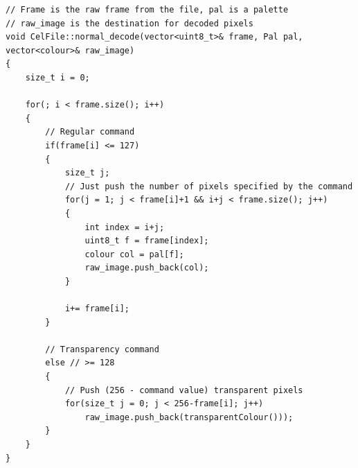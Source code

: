 \documentclass[a4paper]{article}
\begin{document}
	\begin{lstlisting}
// Frame is the raw frame from the file, pal is a palette
// raw_image is the destination for decoded pixels
void CelFile::normal_decode(vector<uint8_t>& frame, Pal pal, vector<colour>& raw_image)
{
    size_t i = 0;
    
    for(; i < frame.size(); i++)
    {   
        // Regular command
        if(frame[i] <= 127)
        {    
            size_t j;
            // Just push the number of pixels specified by the command
            for(j = 1; j < frame[i]+1 && i+j < frame.size(); j++)
            {
                int index = i+j;
                uint8_t f = frame[index];
                colour col = pal[f];
                raw_image.push_back(col);
            }
    
            i+= frame[i];
        }

        // Transparency command
        else // >= 128
        {
            // Push (256 - command value) transparent pixels
            for(size_t j = 0; j < 256-frame[i]; j++)
                raw_image.push_back(transparentColour()));
        }
    }
}
	\end{lstlisting}
\end{document}

